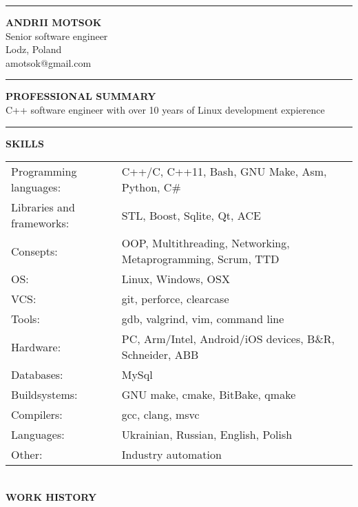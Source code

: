 \documentclass{article}
\begin{document}
\noindent\hrule height 5pt \vspace{4mm} \noindent
{\selectfont\huge{\textbf{ANDRII MOTSOK}}} \\
{\color{lightgray}Senior software engineer\\Lodz, Poland}\\
{\color{cyan}amotsok@gmail.com}\\
{\color{lightgray}\hrule height 0.2mm}
\vspace{2mm}
\noindent
\textbf{PROFESSIONAL SUMMARY}\\
C++ software engineer with over 10 years of Linux development expierence\\
{\color{lightgray}\hrule height 0.2mm} \vspace{2mm}
\noindent
\textbf{SKILLS}\\
\noindent\begin{tabular}{@{}ll}
  Programming languages: & C++/C, C++11, Bash, GNU Make, Asm, Python, C\# \\
  Libraries and frameworks: & STL, Boost, Sqlite, Qt, ACE\\
  Consepts: & OOP, Multithreading, Networking, Metaprogramming, Scrum, TTD\\
  OS: & Linux, Windows, OSX\\
  VCS: & git, perforce, clearcase\\
  Tools: & gdb, valgrind, vim, command line\\
  Hardware: & PC, Arm/Intel, Android/iOS devices, B\&R, Schneider, ABB\\
  Databases: &MySql\\
  Buildsystems: &GNU make, cmake, BitBake, qmake\\
  Compilers: &gcc, clang, msvc\\
  Languages: &Ukrainian, Russian, English, Polish\\
  Other: &  Industry automation\\
\end{tabular}\\
\vspace{2mm}
\noindent \textbf{WORK HISTORY}\\[2mm]
\end{document}
